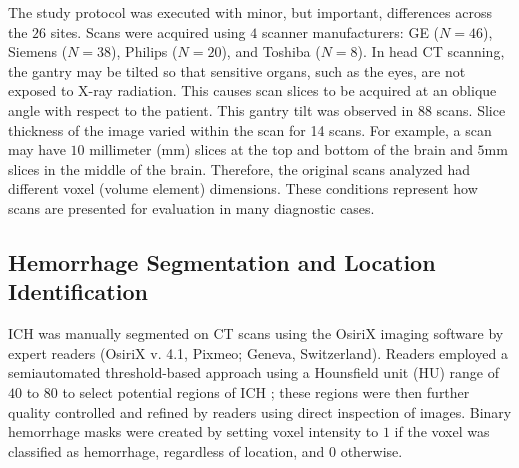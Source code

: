 The study protocol was executed with minor, but important, differences across the $26$ sites.  Scans were acquired using $4$ scanner manufacturers: GE ($N=46$),  Siemens ($N=38$),  Philips ($N=20$),  and Toshiba ($N=8$).   In head CT scanning, the gantry may be tilted so that sensitive organs, such as the eyes, are not exposed to X-ray radiation.  This causes scan slices to be acquired at an oblique angle with respect to the patient.  This gantry tilt was observed in $88$ scans.
Slice thickness of the image varied within the scan for 14 scans.
For example, a scan may have $10$ millimeter (mm) slices at the top and bottom of the brain and $5$mm slices in the middle of the brain.  Therefore, the original scans analyzed had different voxel (volume element) dimensions.  These conditions represent how scans are presented for evaluation in many diagnostic cases.



\subsection{Hemorrhage Segmentation and Location Identification}
ICH was manually segmented on CT scans using the OsiriX imaging software by expert readers (OsiriX v. 4.1, Pixmeo; Geneva, Switzerland).  Readers employed a semiautomated threshold-based approach using a Hounsfield unit (HU) range of $40$ to $80$ to select potential regions of ICH \citep{bergstrom_variation_1977, smith_imaging_2006}; these regions were then further quality controlled and refined by readers using direct inspection of images.  Binary hemorrhage masks were created by setting voxel intensity to $1$ if the voxel was classified as hemorrhage, regardless of location, and $0$ otherwise.  

